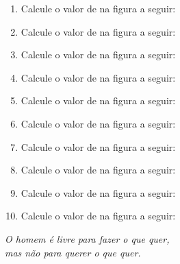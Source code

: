 \documentclass[twocolumn,oneside,a4paper,12pt]{article}
\begin{document}
\pagestyle{empty}
\begin{enumerate}
\item Calcule o valor de  na figura a seguir:

\item Calcule o valor de  na figura a seguir:

\item Calcule o valor de  na figura a seguir:

\item Calcule o valor de  na figura a seguir:

\item Calcule o valor de  na figura a seguir:

\item Calcule o valor de  na figura a seguir:

\item Calcule o valor de  na figura a seguir:


\item Calcule o valor de  na figura a seguir:


\item Calcule o valor de  na figura a seguir:


\item Calcule o valor de  na figura a seguir:


\end{enumerate}

\begin{flushright}
\textit{O homem é livre para fazer o que quer,\\mas não para querer o que quer.}
\end{flushright}
\end{document}
